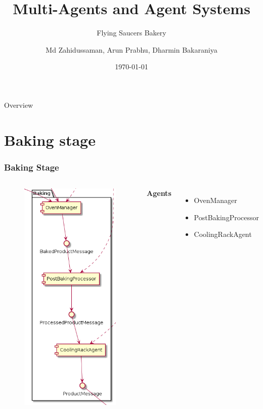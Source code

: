 \documentclass{beamer}
\title{Multi-Agents and Agent Systems}
\subtitle{Flying Saucers Bakery}
\author{Md Zahidussaman, Arun Prabhu, Dharmin Bakaraniya}
\institute{H-BRS}
\date{\today}
\begin{document}
\begin{frame}
    \titlepage{}
\end{frame}

\begin{frame}{Overview}
    \tableofcontents
\end{frame}

\section{Baking stage}%
\label{sec:baking_stage}
\begin{frame}
    \frametitle{\huge{Baking Stage}}
    \begin{columns}[t]
        \begin{figure}[H]
            \centering
            \includegraphics[width=0.6\linewidth]{baking_component_diagram.png}
        \end{figure}
            \textbf{Agents}
            \begin{itemize}
                \item OvenManager
                \item PostBakingProcessor
                \item CoolingRackAgent
            \end{itemize}
    \end{columns}
\end{frame}
\end{document}
